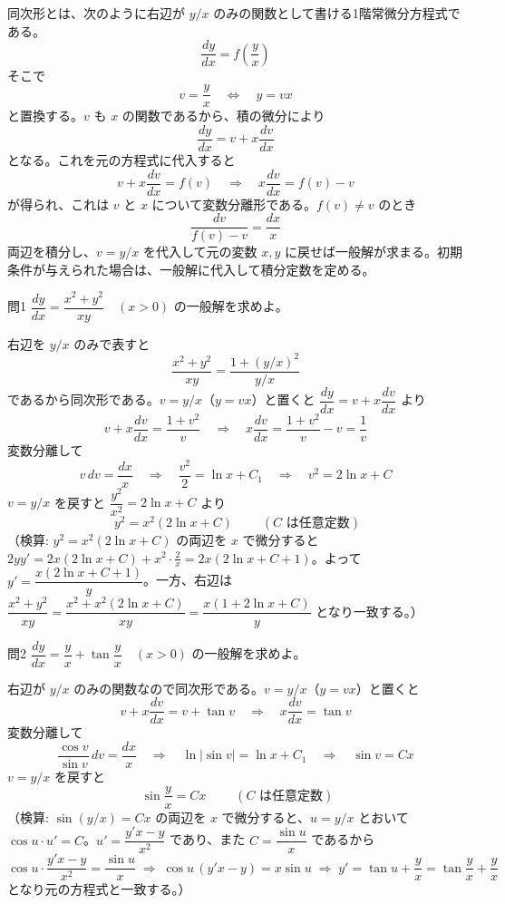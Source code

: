 \documentclass[a4paper,11pt]{article}
\begin{document}


\noindent
同次形とは、次のように右辺が $y/x$ のみの関数として書ける1階常微分方程式である。
\[
\frac{dy}{dx} = f\!\left(\frac{y}{x}\right)
\]
そこで
\[
v = \frac{y}{x} \quad\Longleftrightarrow\quad y = vx
\]
と置換する。$v$ も $x$ の関数であるから、積の微分により
\[
\frac{dy}{dx} = v + x\frac{dv}{dx}
\]
となる。これを元の方程式に代入すると
\[
v + x\frac{dv}{dx} = f(v)
\quad\Longrightarrow\quad
x\frac{dv}{dx} = f(v) - v
\]
が得られ、これは $v$ と $x$ について変数分離形である。$f(v) \neq v$ のとき
\[
\frac{dv}{f(v) - v} = \frac{dx}{x}
\]
両辺を積分し、$v = y/x$ を代入して元の変数 $x, y$ に戻せば一般解が求まる。初期条件が与えられた場合は、一般解に代入して積分定数を定める。

\clearpage
\begin{mondaiboxS}{問1}
$\dfrac{dy}{dx} = \dfrac{x^{2} + y^{2}}{xy} \quad (x > 0)$ の一般解を求めよ。
\end{mondaiboxS}
\kaitou
右辺を $y/x$ のみで表すと
\[
\frac{x^{2}+y^{2}}{xy} = \frac{1 + (y/x)^{2}}{y/x}
\]
であるから同次形である。$v = y/x$（$y = vx$）と置くと $\dfrac{dy}{dx} = v + x\dfrac{dv}{dx}$ より
\[
v + x\frac{dv}{dx} = \frac{1+v^{2}}{v}
\quad\Longrightarrow\quad
x\frac{dv}{dx} = \frac{1+v^{2}}{v} - v = \frac{1}{v}
\]
変数分離して
\[
v\,dv = \frac{dx}{x}
\quad\Longrightarrow\quad
\frac{v^{2}}{2} = \ln x + C_{1}
\quad\Longrightarrow\quad
v^{2} = 2\ln x + C
\]
$v = y/x$ を戻すと $\dfrac{y^{2}}{x^{2}} = 2\ln x + C$ より
\[
\boxed{\; y^{2} = x^{2}\left(2\ln x + C\right) \;}
\qquad (C \text{ は任意定数})
\]
（検算: $y^{2}=x^{2}(2\ln x+C)$ の両辺を $x$ で微分すると $2yy' = 2x(2\ln x+C) + x^{2}\cdot\frac{2}{x} = 2x(2\ln x+C+1)$。よって $y' = \dfrac{x(2\ln x+C+1)}{y}$。一方、右辺は $\dfrac{x^{2}+y^{2}}{xy} = \dfrac{x^{2}+x^{2}(2\ln x+C)}{xy} = \dfrac{x(1+2\ln x+C)}{y}$ となり一致する。）

\clearpage
\begin{mondaiboxS}{問2}
$\dfrac{dy}{dx} = \dfrac{y}{x} + \tan\dfrac{y}{x} \quad (x > 0)$ の一般解を求めよ。
\end{mondaiboxS}
\kaitou
右辺が $y/x$ のみの関数なので同次形である。$v = y/x$（$y=vx$）と置くと
\[
v + x\frac{dv}{dx} = v + \tan v
\quad\Longrightarrow\quad
x\frac{dv}{dx} = \tan v
\]
変数分離して
\[
\frac{\cos v}{\sin v}\,dv = \frac{dx}{x}
\quad\Longrightarrow\quad
\ln|\sin v| = \ln x + C_{1}
\quad\Longrightarrow\quad
\sin v = Cx
\]
$v = y/x$ を戻すと
\[
\boxed{\; \sin\frac{y}{x} = Cx \;}
\qquad (C \text{ は任意定数})
\]
（検算: $\sin(y/x) = Cx$ の両辺を $x$ で微分すると、$u=y/x$ とおいて $\cos u \cdot u' = C$。$u' = \dfrac{y'x - y}{x^{2}}$ であり、また $C = \dfrac{\sin u}{x}$ であるから
\[
\cos u\cdot\frac{y'x-y}{x^{2}} = \frac{\sin u}{x}
\;\Longrightarrow\;
\cos u\,(y'x - y) = x\sin u
\;\Longrightarrow\;
y' = \tan u + \frac{y}{x} = \tan\frac{y}{x} + \frac{y}{x}
\]
となり元の方程式と一致する。）
\end{document}
